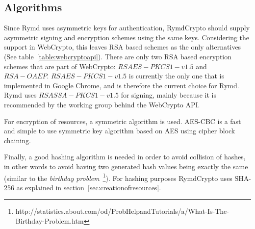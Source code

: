 \subsection{Algorithms}
Since Rymd uses asymmetric keys for authentication, RymdCrypto should supply asymmetric signing and encryption schemes using the same keys. Considering the support in WebCrypto, this leaves RSA based schemes as the only alternatives (See table~\ref{table:webcryptoapi}). There are only two RSA based encryption schemes that are part of WebCrypto: $RSAES-PKCS1-v1.5$ and $RSA-OAEP$. $RSAES-PKCS1-v1.5$ is currently the only one that is implemented in Google Chrome, and is therefore the current choice for Rymd.  Rymd uses $RSASSA-PKCS1-v1.5$ for signing, mainly because it is recommended by the working group behind the WebCrypto API.

For encryption of resources, a symmetric algorithm is used. AES-CBC is a fast and simple to use symmetric key algorithm based on AES using cipher block chaining\cite{AESISFAST:Online}.

Finally, a good hashing algorithm is needed in order to avoid collision of hashes, in other words to avoid having two generated hash values being exactly the same (similar to the \emph{birthday problem}~\footnote{http://statistics.about.com/od/ProbHelpandTutorials/a/What-Is-The-Birthday-Problem.htm}). For hashing purposes RymdCrypto uses SHA-256 as explained in section~\ref{sec:creationofresources}.




